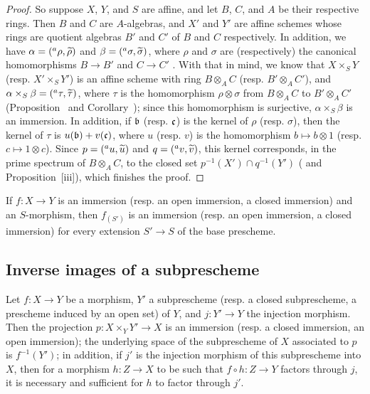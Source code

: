 \begin{proof}
So suppose $X$, $Y$, and $S$ are affine, and let $B$, $C$, and $A$ be their respective rings.
Then $B$ and $C$ are $A$-algebras, and $X'$ and $Y'$ are affine schemes whose rings are quotient algebras $B'$ and $C'$ of $B$ and $C$ respectively.
In addition, we have $\alpha=({}^a\rho,{\widetilde{\rho}})$ and $\beta=({}^a\sigma,{\widetilde{\sigma}})$, where $\rho$ and $\sigma$ are (respectively) the canonical homomorphisms $B\to B'$ and $C\to C'$ .
With that in mind, we know that $X\times_S Y$ (resp. $X'\times_S Y'$) is an affine scheme with ring $B\otimes_A C$ (resp. $B'\otimes_A C'$), and $\alpha\times_S\beta=({}^a\tau,{\widetilde{\tau}})$, where $\tau$ is the homomorphism $\rho\otimes\sigma$ from $B\otimes_A C$ to $B'\otimes_A C'$ (Proposition~ and Corollary~);
since this homomorphism is surjective, $\alpha\times_S\beta$ is an immersion.
In addition, if $\mathfrak{b}$ (resp. $\mathfrak{c}$) is the kernel of $\rho$ (resp. $\sigma$), then the kernel of $\tau$ is $u(\mathfrak{b})+v(\mathfrak{c})$, where $u$ (resp. $v$) is the homomorphism $b\mapsto b\otimes 1$ (resp. $c\mapsto 1\otimes c$).
Since $p=({}^a u,{\widetilde{u}})$ and $q=({}^a v,{\widetilde{v}})$, this kernel corresponds, in the prime spectrum of $B\otimes_A C$, to the closed set $p^{-1}(X')\cap q^{-1}(Y')$ ( and Proposition~[iii]), which finishes the proof.
\end{proof}

\begin{cor}[4.3.2]
\label{1.4.3.2}
If $f:X\to Y$ is an immersion (resp. an open immersion, a closed immersion) and an $S$-morphism, then $f_{(S')}$ is an immersion (resp. an open immersion, a closed immersion) for every extension $S'\to S$ of the base prescheme.
\end{cor}

\subsection{Inverse images of a subprescheme}
\label{subsection-inverse-image-of-subprescheme}

\begin{prop}[4.4.1]
\label{1.4.4.1}
Let $f:X\to Y$ be a morphism, $Y'$ a subprescheme (resp. a closed subprescheme, a prescheme induced by an open set) of $Y$, and $j:Y'\to Y$ the injection morphism.
Then the projection $p:X\times_Y Y'\to X$ is an immersion (resp. a closed immersion, an open immersion);
the underlying space of the subprescheme of $X$ associated to $p$ is $f^{-1}(Y')$;
in addition, if $j'$ is the injection morphism of this subprescheme into $X$, then for a morphism $h:Z\to X$ to be such that $f\circ h:Z\to Y$ factors through $j$, it is necessary and sufficient for $h$ to factor through $j'$.
\end{prop}

